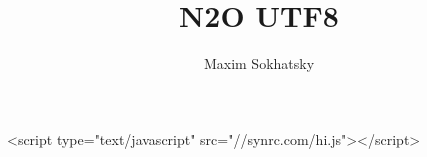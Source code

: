 

\title{N2O UTF8}
\author{Maxim Sokhatsky}


\begin{rawhtml}
<script type="text/javascript" src="//synrc.com/hi.js"></script>
\end{rawhtml}
